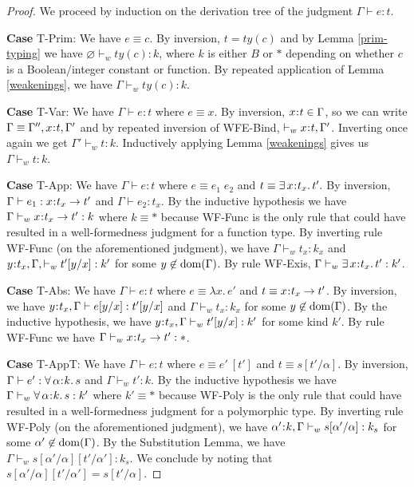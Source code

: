 \documentclass[11pt]{article}
\newcommand{\al}{\alpha}
\newcommand{\bind}{\hspace{0.05em}{:}\hspace{0.05em}} %
\newcommand{\existype}[3]{\exists\, #1\bind #2.\, #3}
\newcommand{\polytype}[3]{\forall\, #1\bind #2.\, #3}
\newcommand{\functype}[3]{#1\bind #2 \rightarrow #3}
\newcommand{\dom}[1]{{\rm dom}(#1)}
\begin{document}
\begin{proof} 
We proceed by induction on the derivation tree of the judgment $\Gamma \vdash e : t$.

{\bf Case} {\sc T-Prim}: We have $e \equiv c$. By inversion, $t = ty(c)$ and by Lemma \ref{prim-typing} we have $\varnothing \vdash_ w ty(c) : k$, where $k$ is either $B$ or $*$ depending on whether $c$ is a Boolean/integer constant or function. By repeated application of Lemma \ref{weakenings}, we have $\Gamma \vdash_w ty(c) : k$. 

{\bf Case} {\sc T-Var}: We have $\Gamma \vdash e : t$ where $e \equiv x$. By inversion, $x\bind t \in \Gamma$, so we can write $\Gamma \equiv \Gamma'', x\bind t,\Gamma'$ and by repeated inversion of {\sc WFE-Bind}, $\vdash_w x\bind t,\Gamma'$. Inverting once again we get $\Gamma' \vdash_w t : k$. Inductively applying Lemma \ref{weakenings} gives us $\Gamma \vdash_w t : k$.

{\bf Case} {\sc T-App}: We have $\Gamma \vdash e : t$ where $e \equiv e_1\; e_2$ and $t \equiv \existype{x}{t_x}{t'}.$ By inversion, $\Gamma \vdash e_1 : \functype{x}{t_x}{t'}$ and $\Gamma \vdash e_2 : t_x$. By the inductive hypothesis we have $\Gamma \vdash_w \functype{x}{t_x}{t'} : k$ where $k \equiv *$ because {\sc WF-Func} is the only rule that could have resulted in a well-formedness judgment for a function type. By inverting rule {\sc WF-Func} (on the aforementioned judgment), we have $\Gamma \vdash_w t_x : k_x$ and $y\bind t_x, \Gamma, \vdash_w t'[y/x] : k'$ for some $y\not\in\dom{\Gamma}$. By rule {\sc WF-Exis}, $\Gamma \vdash_w \existype{x}{t_x}{t'} : k'$.

{\bf Case} {\sc T-Abs}: We have $\Gamma \vdash e : t$ where $e \equiv \lambda x.\, e'$ and $t \equiv \functype{x}{t_x}{t'}$. By inversion, we have $y\bind t_x,\Gamma \vdash e[y/x] : t'[y/x]$ and $\Gamma \vdash_w t_x : k_x$ for some $y\not\in\dom{\Gamma}$. By the inductive hypothesis, we have $y\bind t_x, \Gamma\vdash_w t'[y/x] : k'$ for some kind $k'$. By rule {\sc WF-Func} we have $\Gamma \vdash_w \functype{x}{t_x}{t'} : *$.

{\bf Case} {\sc T-AppT}: We have $\Gamma \vdash e : t$ where $e \equiv e'\: [t']$ and $t \equiv s[t'/\al]$. By inversion, $\Gamma \vdash e' : \polytype{\al}{k}{s}$ and $\Gamma \vdash_w t' : k$. By the inductive hypothesis we have $\Gamma \vdash_w \polytype{\al}{k}{s} : k'$ where $k' \equiv *$ because {\sc WF-Poly} is the only rule that could have resulted in a well-formedness judgment for a polymorphic type. 
By inverting rule {\sc WF-Poly} (on the aforementioned judgment), we have $\al'\bind k, \Gamma \vdash_w s[\al'/\al] : k_s$ for some $\al'\not\in\dom{\Gamma}$. By the Substitution Lemma, we have $\Gamma \vdash_w s[\al'/\al][t'/\al'] : k_s$. We conclude by noting that  $s[\al'/\al][t'/\al'] = s[t'/\al]$.


\end{proof}
\end{document}

